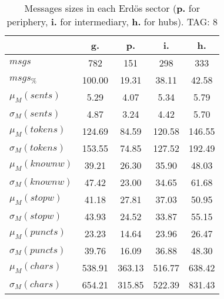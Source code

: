\begin{table}[h!]
\begin{center}
\begin{tabular}{| l || c | c | c | c |}\hline
 & {\bf g.} & {\bf p.} & {\bf i.} & {\bf h.} \\\hline\hline
$msgs$ & 782  & 151  & 298  & 333 \\
$msgs_{\%}$ & 100.00  & 19.31  & 38.11  & 42.58 \\\hline
$\mu_M(sents)$ & 5.29  & 4.07  & 5.34  & 5.79 \\
$\sigma_M(sents)$ & 4.87  & 3.24  & 4.42  & 5.70 \\\hline
$\mu_M(tokens)$ & 124.69  & 84.59  & 120.58  & 146.55 \\
$\sigma_M(tokens)$ & 153.55  & 74.85  & 127.52  & 192.49 \\\hline
$\mu_M(knownw)$ & 39.21  & 26.30  & 35.90  & 48.03 \\
$\sigma_M(knownw)$ & 47.42  & 23.00  & 34.65  & 61.68 \\\hline
$\mu_M(stopw)$ & 41.18  & 27.81  & 37.03  & 50.95 \\
$\sigma_M(stopw)$ & 43.93  & 24.52  & 33.87  & 55.15 \\\hline
$\mu_M(puncts)$ & 23.23  & 14.64  & 23.96  & 26.47 \\
$\sigma_M(puncts)$ & 39.76  & 16.09  & 36.88  & 48.30 \\\hline
$\mu_M(chars)$ & 538.91  & 363.13  & 516.77  & 638.42 \\
$\sigma_M(chars)$ & 654.21  & 315.85  & 522.39  & 831.43 \\\hline
\end{tabular}
\caption{Messages sizes in each Erd\"os sector ({{\bf p.}} for periphery, {{\bf i.}} for intermediary, {{\bf h.}} for hubs). TAG: 8}
\end{center}
\end{table}
